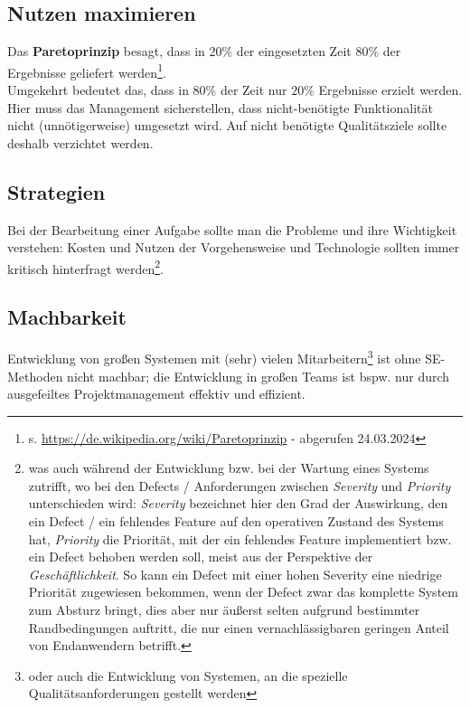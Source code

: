 \subsection*{Nutzen maximieren}
Das \textbf{Paretoprinzip} besagt, dass in $20$\% der eingesetzten Zeit $80$\% der Ergebnisse geliefert werden\footnote{
s. \url{https://de.wikipedia.org/wiki/Paretoprinzip} - abgerufen 24.03.2024
}.\\
Umgekehrt bedeutet das, dass in $80$\% der Zeit nur $20$\% Ergebnisse erzielt werden.\\
Hier muss das Management sicherstellen, dass nicht-benötigte Funktionalität nicht (unnötigerweise) umgesetzt wird.
Auf nicht benötigte Qualitätsziele sollte deshalb verzichtet werden.\\

\subsection*{Strategien}
Bei der Bearbeitung einer Aufgabe sollte man die Probleme und ihre Wichtigkeit verstehen: Kosten und Nutzen der Vorgehensweise und Technologie sollten immer kritisch hinterfragt werden\footnote{
    was auch während der Entwicklung bzw. bei der Wartung eines Systems zutrifft, wo bei den Defects / Anforderungen zwischen \textit{Severity} und \textit{Priority} unterschieden wird: \textit{Severity} bezeichnet hier den Grad der Auswirkung, den ein Defect / ein fehlendes Feature auf den operativen Zustand des Systems hat, \textit{Priority} die Priorität, mit der ein fehlendes Feature implementiert bzw. ein Defect behoben werden soll, meist aus der Perspektive der \textit{Geschäftlichkeit}. So kann ein Defect mit einer hohen Severity eine niedrige Priorität zugewiesen bekommen, wenn der Defect zwar das komplette System zum Absturz bringt, dies aber nur äußerst selten aufgrund bestimmter Randbedingungen auftritt, die nur einen vernachlässigbaren geringen Anteil von Endanwendern betrifft.
}.

\subsection*{Machbarkeit}
Entwicklung von großen Systemen mit (sehr) vielen Mitarbeitern\footnote{
oder auch die Entwicklung von Systemen, an die spezielle Qualitätsanforderungen gestellt werden} ist ohne SE-Methoden nicht machbar; die Entwicklung in großen Teams ist bspw. nur durch ausgefeiltes Projektmanagement effektiv und effizient.
